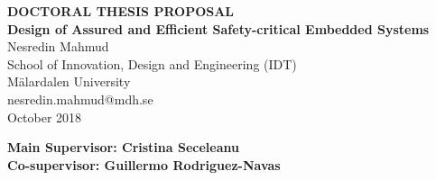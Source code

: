 \documentclass{NSF}
\begin{document}
\begin{center}
	\vspace{4cm}
	
	\LARGE \textbf {DOCTORAL THESIS PROPOSAL} \\[3cm]
	
	\LARGE \textbf {Design of Assured and Efficient Safety-critical Embedded Systems} \\[2cm]
	
	\normalsize{Nesredin Mahmud } \\
	School of Innovation, Design and Engineering (IDT) \\
	M\"{a}lardalen University \\
	nesredin.mahmud@mdh.se \\
	October 2018\\
	
	\vspace{3cm}
	
	\begin{minipage}{1.0\textwidth}
		\begin{flushright} \small
			\textbf{Main Supervisor: Cristina Seceleanu} \\
			\textbf{Co-supervisor: Guillermo Rodriguez-Navas}
		\end{flushright}
	\end{minipage}
	
	\vfill
	
	
\end{center}

\newpage
\end{document}

